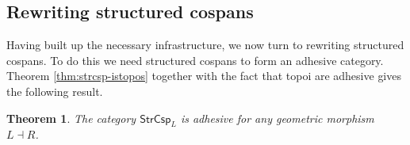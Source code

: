 \documentclass{amsart}
\newcommand{\C}{\cat{C}}
\newcommand{\D}{\cat{D}}
\newcommand{\Cat}{\cat{Cat}}
\newcommand{\Span}{\cat{Span}}
\newcommand{\Gram}{\cat{Gram}}
\newcommand{\StrCsp}{\cat{StrCsp}}
\newcommand{\Lang}{\mathrm{Lang}}
\newcommand{\defn}[1]{\textbf{#1}}
\newcommand{\cat}[1]{\mathsf{#1}}
\newcommand{\from}{\colon}
\newcommand{\xto}[1]{\xrightarrow{#1}}
\newcommand{\deriv}[2]{#1 \rightsquigarrow^\ast #2}
\newcommand{\xgets}[1]{\xleftarrow{#1}}
\newtheorem{theorem}{Theorem}[section]
\newtheorem{lemma}[theorem]{Lemma}
\theoremstyle{remark}
\theoremstyle{definition}
\begin{document}






\subsection{Rewriting structured cospans}
\label{sec:Rewriting-StrCsp}

Having built up the necessary infrastructure, we now turn to rewriting
structured cospans. To do this we need structured cospans to form an
adhesive category. Theorem \ref{thm:strcsp-istopos} together with the
fact that topoi are adhesive \cite{LackSobo_ToposIsAdh} gives the
following result.

\begin{theorem} \label{thm:dpo_category-StrCsp-adhsv}
  The category $ \StrCsp_{L} $ is adhesive for any geometric morphism
  $ L \dashv R $.
\end{theorem}
\end{document}

